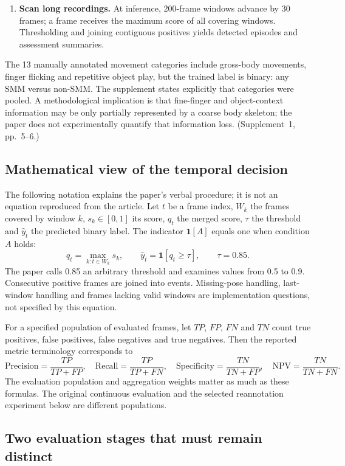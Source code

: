 \begin{enumerate}[leftmargin=*]
\item \textbf{Scan long recordings.} At inference, 200-frame windows advance by 30 frames; a frame receives the maximum score of all covering windows. Thresholding and joining contiguous positives yields detected episodes and assessment summaries. \cite[pp.~4--5]{barami2024}
\end{enumerate}

The 13 manually annotated movement categories include gross-body movements, finger flicking and repetitive object play, but the trained label is binary: any SMM versus non-SMM. The supplement states explicitly that categories were pooled. A methodological implication is that fine-finger and object-context information may be only partially represented by a coarse body skeleton; the paper does not experimentally quantify that information loss. (Supplement~1, pp.~5--6.)

\subsection{Mathematical view of the temporal decision}
The following notation explains the paper's verbal procedure; it is not an equation reproduced from the article. Let $t$ be a frame index, $W_k$ the frames covered by window $k$, $s_k\in[0,1]$ its score, $q_t$ the merged score, $\tau$ the threshold and $\widehat y_t$ the predicted binary label. The indicator $\mathbf{1}[A]$ equals one when condition $A$ holds:
\[
q_t=\max_{k:t\in W_k}s_k,
\qquad \widehat y_t=\mathbf{1}[q_t\geq\tau],
\qquad \tau=0.85.
\]
The paper calls 0.85 an arbitrary threshold and examines values from 0.5 to 0.9. Consecutive positive frames are joined into events. Missing-pose handling, last-window handling and frames lacking valid windows are implementation questions, not specified by this equation. \cite[pp.~4--5]{barami2024}

For a specified population of evaluated frames, let $TP$, $FP$, $FN$ and $TN$ count true positives, false positives, false negatives and true negatives. Then the reported metric terminology corresponds to
\[
\mathrm{Precision}=\frac{TP}{TP+FP},\quad
\mathrm{Recall}=\frac{TP}{TP+FN},\quad
\mathrm{Specificity}=\frac{TN}{TN+FP},\quad
\mathrm{NPV}=\frac{TN}{TN+FN}.
\]
The evaluation population and aggregation weights matter as much as these formulas. The original continuous evaluation and the selected reannotation experiment below are different populations. \cite[pp.~5,7]{barami2024}

\subsection{Two evaluation stages that must remain distinct}
